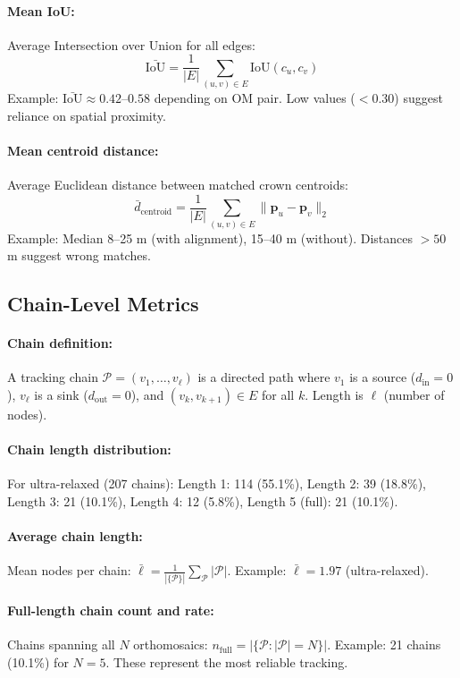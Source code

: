 \paragraph{Mean IoU:}
Average Intersection over Union for all edges:
\[
\bar{\text{IoU}} = \frac{1}{|E|} \sum_{(u,v) \in E} \text{IoU}(c_u, c_v)
\]
Example: $\bar{\text{IoU}} \approx 0.42$--$0.58$ depending on OM pair. Low values ($< 0.30$) suggest reliance on spatial proximity.

\paragraph{Mean centroid distance:}
Average Euclidean distance between matched crown centroids:
\[
\bar{d}_{\text{centroid}} = \frac{1}{|E|} \sum_{(u,v) \in E} \|\mathbf{p}_u - \mathbf{p}_v\|_2
\]
Example: Median 8--25 m (with alignment), 15--40 m (without). Distances $> 50$ m suggest wrong matches.

\subsection{Chain-Level Metrics}

\paragraph{Chain definition:}
A tracking chain $\mathcal{P} = (v_1, \ldots, v_\ell)$ is a directed path where $v_1$ is a source ($d_{\text{in}} = 0$), $v_\ell$ is a sink ($d_{\text{out}} = 0$), and $(v_k, v_{k+1}) \in E$ for all $k$. Length is $\ell$ (number of nodes).

\paragraph{Chain length distribution:}
For ultra-relaxed (207 chains): Length 1: 114 (55.1\%), Length 2: 39 (18.8\%), Length 3: 21 (10.1\%), Length 4: 12 (5.8\%), Length 5 (full): 21 (10.1\%).

\paragraph{Average chain length:}
Mean nodes per chain: $\bar{\ell} = \frac{1}{|\{\mathcal{P}\}|} \sum_{\mathcal{P}} |\mathcal{P}|$. Example: $\bar{\ell} = 1.97$ (ultra-relaxed).

\paragraph{Full-length chain count and rate:}
Chains spanning all $N$ orthomosaics: $n_{\text{full}} = |\{\mathcal{P} : |\mathcal{P}| = N\}|$. Example: 21 chains (10.1\%) for $N=5$. These represent the most reliable tracking.

